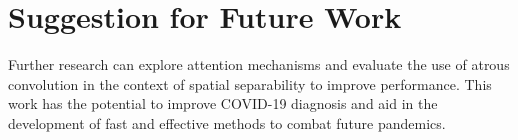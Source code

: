 \section{Suggestion for Future Work}

Further research can explore attention mechanisms and evaluate the use of atrous convolution in the context of spatial separability to improve performance. This work has the potential to improve COVID-19 diagnosis and aid in the development of fast and effective methods to combat future pandemics.
